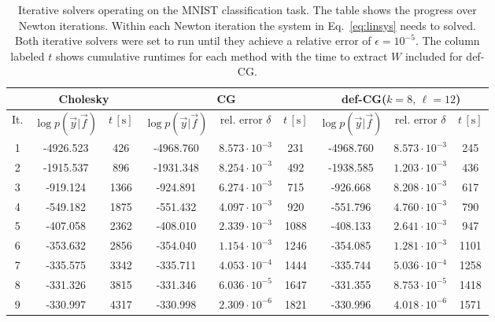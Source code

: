 \documentclass{article}
\begin{document}
%  

\setlength{\tabcolsep}{5.4pt} %
\begin{table}
	\caption{Iterative solvers operating on the MNIST classification task. The table shows the progress over Newton iterations. Within each Newton iteration the system in Eq.~\eqref{eq:linsys} needs to solved. Both iterative solvers were set to run until they achieve a relative error of $\epsilon=10^{-5}$. The column labeled $t$ shows cumulative runtimes for each method with the time to extract $W$ included for def-CG.}
	\label{tab:acc}
	\centering
	\begin{tabular}{c|cc|ccc|ccc}
	\toprule
	 & \multicolumn{2}{|c|}{Cholesky} &\multicolumn{3}{|c|}{CG} &\multicolumn{3}{|c}{def-CG($k=8,\,\ell = 12$)}  \\
	\midrule
	   It. & $\log p(\vec{y}|\vec{f})$ & $t\,[\mathrm{s}]$  & $\log p(\vec{y}|\vec{f})$ & rel. error $\delta$ & $t\,[\mathrm{s}]$ & $\log p(\vec{y}|\vec{f})$ & rel. error $\delta$ & $t\,[\mathrm{s}]$\\
	\midrule
	1 & -4926.523 & 426& -4968.760 &$8.573\cdot10^{-3}$ &231 &  -4968.760 & $8.573\cdot10^{-3}$ & 245   \\
	2 & -1915.537 &896 & -1931.348 & $8.254\cdot10^{-3}$&492 &  -1938.585 & $1.203\cdot10^{-3}$ & 436   \\
	3 & -919.124  &1366 & -924.891 & $6.274\cdot10^{-3}$&715 &  -926.668 & $8.208\cdot10^{-3}$ &  617  \\
	4 & -549.182  &1875 & -551.432 & $4.097\cdot10^{-3}$&920 &  -551.796 & $4.760\cdot10^{-3}$ &  790  \\
	5 & -407.058  &2362 & -408.010 & $2.339\cdot10^{-3}$&1088 &  -408.133 & $2.641\cdot10^{-3}$ &  947  \\
	6 & -353.632  &2856 & -354.040 & $1.154\cdot10^{-3}$&1246 &  -354.085 & $1.281\cdot10^{-3}$ &  1101  \\
	7 & -335.575  & 3342& -335.711 & $4.053\cdot10^{-4}$& 1444&  -335.744 & $5.036\cdot10^{-4}$ &  1258  \\
	8 & -331.326  &3815& -331.346 & $6.036\cdot10^{-5}$&1647 &  -331.355 & $8.753\cdot10^{-5}$ &  1418  \\
	9 & -330.997  &4317& -330.998 & $2.309\cdot10^{-6}$&1821 &  -330.996  & $4.018\cdot10^{-6}$ &  1571  \\
	\bottomrule
	\end{tabular}
\end{table}
\end{document}
